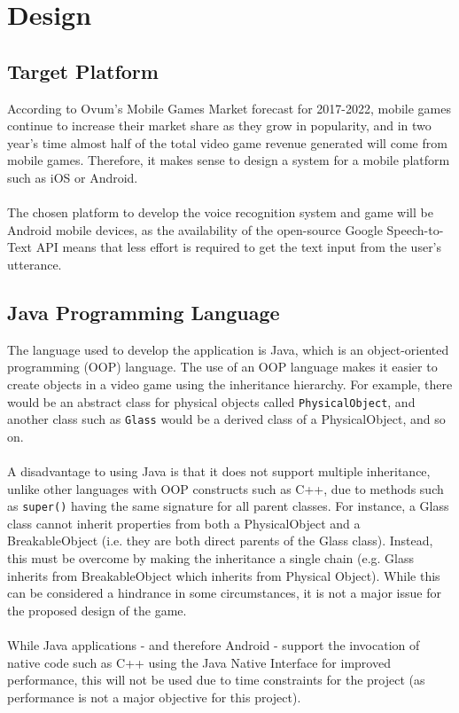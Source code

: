 \documentclass[12pt]{article}
\begin{document}
\section{Design}
\subsection{Target Platform}

According to Ovum's Mobile Games Market forecast for 2017-2022, mobile games continue to increase their market share as they grow in popularity, and in two year's time almost half of the total video game revenue generated will come from mobile games. Therefore, it makes sense to design a system for a mobile platform such as iOS or Android.
\\
\\
The chosen platform to develop the voice recognition system and game will be Android mobile devices, as the availability of the open-source Google Speech-to-Text API means that less effort is required to get the text input from the user's utterance.

\subsection{Java Programming Language}

The language used to develop the application is Java, which is an object-oriented programming (OOP) language. The use of an OOP language makes it easier to create objects in a video game using the inheritance hierarchy. For example, there would be an abstract class for physical objects called \texttt{PhysicalObject}, and another class such as \texttt{Glass} would be a derived class of a PhysicalObject, and so on.
\\
\\
A disadvantage to using Java is that it does not support multiple inheritance, unlike other languages with OOP constructs such as C++, due to methods such as \texttt{super()} having the same signature for all parent classes. For instance, a Glass class cannot inherit properties from both a PhysicalObject and a BreakableObject (i.e. they are both direct parents of the Glass class). Instead, this must be overcome by making the inheritance a single chain (e.g. Glass inherits from BreakableObject which inherits from Physical Object). While this can be considered a hindrance in some circumstances, it is not a major issue for the proposed design of the game.
\\
\\
While Java applications - and therefore Android - support the invocation of native code such as C++ using the Java Native Interface for improved performance, this will not be used due to time constraints for the project (as performance is not a major objective for this project).
\end{document}
